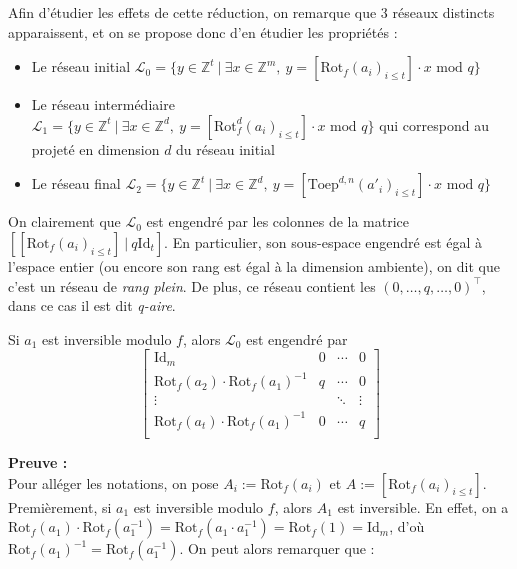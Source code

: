 \documentclass[11pt,a4paper]{article}
\begin{document}
Afin d'étudier les effets de cette réduction, on remarque que $3$ réseaux distincts apparaissent, et on se propose donc d'en étudier les propriétés : 
\begin{itemize}
\item Le réseau initial $\mathcal{L}_0 = \{ y \in \mathbb{Z}^t \ | \ \exists x\in \mathbb{Z}^m,\ y=[\text{Rot}_f(a_i)_{i\leq t}]\cdot x \text{ mod }q \}$
\item Le réseau intermédiaire $\mathcal{L}_1 =\{ y \in \mathbb{Z}^t \ | \ \exists x\in \mathbb{Z}^d,\ y=[\text{Rot}_f^d(a_i)_{i\leq t}]\cdot x \text{ mod }q \}$  qui correspond au projeté en dimension $d$ du réseau initial
\item Le réseau final $\mathcal{L}_2 = \{ y \in \mathbb{Z}^t \ | \ \exists x\in \mathbb{Z}^d,\ y=[\text{Toep}^{d,n}(a'_i)_{i\leq t}]\cdot x \text{ mod }q\}$ \\
\end{itemize}

On clairement que $\mathcal{L}_0$ est engendré par les colonnes de la matrice $[[\text{Rot}_f(a_i)_{i\leq t}] \ |\ q\text{Id}_t]$. En particulier, son sous-espace engendré est égal à l'espace entier (ou encore son rang est égal à la dimension ambiente), on dit que c'est un réseau de \textit{rang plein}. De plus, ce réseau contient les $(0,\dots,q,\dots,0)^\top$, dans ce cas il est dit \textit{q-aire}.\\

\begin{lemma}
Si $a_1$ est inversible modulo $f$, alors $\mathcal{L}_0$ est engendré par 
$$ \left[\begin{array}{c|ccc}
\text{Id}_m & 0 &\cdots &0\\
\text{Rot}_f(a_2)\cdot\text{Rot}_f(a_1)^{-1}&q&\cdots & 0\\
\vdots & &\ddots & \vdots\\
\text{Rot}_f(a_t)\cdot\text{Rot}_f(a_1)^{-1}& 0 & \cdots &q\\
\end{array}\right] $$
\end{lemma}
\textbf{Preuve :} \\
Pour alléger les notations, on pose $A_i := \text{Rot}_f(a_i)$ et $A:=[\text{Rot}_f(a_i)_{i\leq t}]$. Premièrement, si $a_1$ est inversible modulo $f$, alors $A_1$ est inversible. En effet, on a $\text{Rot}_f(a_1)\cdot\text{Rot}_f(a_1^{-1})=\text{Rot}_f(a_1\cdot a_1^{-1})=\text{Rot}_f(1)=\text{Id}_m$, d'où $\text{Rot}_f(a_1)^{-1}=\text{Rot}_f(a_1^{-1})$. On peut alors remarquer que : \\
\end{document}
